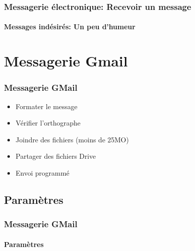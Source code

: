 \documentclass[xcolor=table]{beamer}
\begin{document}
\begin{frame}
\frametitle{Messagerie électronique: Recevoir un message}
\framesubtitle{Messages indésirés: Un peu d'humeur}

\begin{center}
\end{center}

\end{frame}


\section{Messagerie Gmail}

\begin{frame}
\frametitle{Messagerie GMail}

\begin{minipage}{0.48\textwidth}
	\begin{itemize}
		\item Formater le message
		\item Vérifier l'orthographe
		\item Joindre des fichiers (moins de 25MO)
		\item Partager des fichiers Drive
		\item Envoi programmé
	\end{itemize}
\end{minipage}
\begin{minipage}{0.48\textwidth}
\end{minipage}

\end{frame}

\subsection{Paramètres}

\begin{frame}
\frametitle{Messagerie GMail}
\framesubtitle{Paramètres}

\begin{center}
\end{center}

\end{frame}
\end{document}
